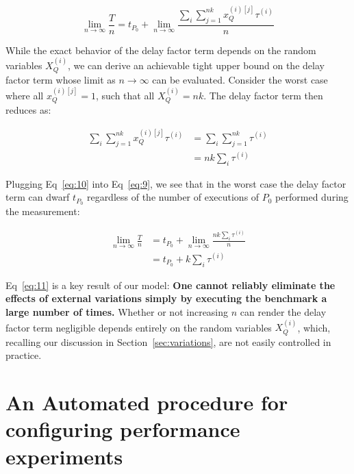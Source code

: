 \documentclass[conference]{IEEEtran}
\begin{document}
\vspace{-0.10cm}
\begin{equation}  \label{eq:9}
    \lim_{n\to\infty} \frac{T}{n} = t_{P_0} + \lim_{n\to\infty} \frac{\sum_{i} \sum_{j=1}^{nk} x_Q^{(i)[j]} \tau^{(i)}}{n}
\end{equation}

While the exact behavior of the delay factor term depends on the random variables
$X_Q^{(i)}$, we can derive an achievable tight upper bound on the delay factor term whose
limit as $n \to \infty$ can be evaluated. Consider the worst case where all $x_Q^{(i)[j]} =
1$, such that all $X_Q^{(i)} = nk$. The delay factor term then reduces as:

\vspace{-0.35cm}
\begin{align} \label{eq:10}
    \sum_{i} \sum_{j=1}^{nk} x_Q^{(i)[j]} \tau^{(i)} &= \sum_{i} \sum_{j=1}^{nk} \tau^{(i)} \\ \nonumber
                                                     &= nk \sum_{i} \tau^{(i)}
\end{align}

Plugging Eq~\ref{eq:10} into Eq~\ref{eq:9}, we see that in the worst case the delay factor
term can dwarf $t_{P_0}$ regardless of the number of executions of $P_0$ performed during
the measurement:

\vspace{-0.35cm}
\begin{align} \label{eq:11}
    \lim_{n\to\infty} \frac{T}{n} &= t_{P_0} + \lim_{n\to\infty} \frac{nk \sum_{i} \tau^{(i)}}{n} \\ \nonumber
                                  &= t_{P_0} + k \sum_{i} \tau^{(i)}
\end{align}

Eq~\ref{eq:11} is a key result of our model: \textbf{One cannot reliably eliminate the
effects of external variations simply by executing the benchmark a large number of times.}
Whether or not increasing $n$ can render the delay factor term negligible depends entirely on
the random variables $X_Q^{(i)}$, which, recalling our discussion in
Section~\ref{sec:variations}, are not easily controlled in practice.

\section{An Automated procedure for configuring performance experiments}
\label{sec:confexperiment}
\end{document}
